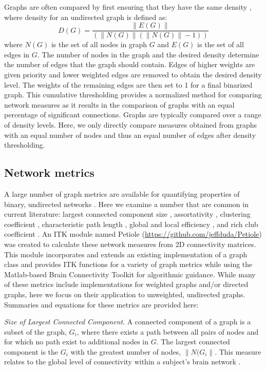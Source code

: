\documentclass{frontiersSCNS} %
\begin{document}
Graphs are often compared by first ensuring that they have the same density \citep{Achard2006,Bassett2006}, where density for an undirected graph is defined as:
$$D(G) = \frac{\|E(G)\|}{( \|N(G)\| (\|N(G)\|-1) )} $$
where $N(G)$ is the set of all nodes in graph $G$ and $E(G)$ is the set of all edges in $G$. The number of nodes in the graph and the desired density determine the number of edges that the graph should contain. Edges of higher weights are given priority and lower weighted edges are removed to obtain the desired density level. The weights of the remaining edges are then set to 1 for a final binarized graph. This cumulative thresholding provides a normalized method for comparing network measures as it results in the comparison of graphs with an equal percentage of significant connections. Graphs are typically compared over a range of density levels.  Here, we only directly compare measures obtained from graphs with an equal number of nodes and thus an equal number of edges after density thresholding.

\subsection{Network metrics}
A large number of graph metrics are available for quantifying properties of binary, undirected networks \citep{Rubinov2010}. Here we examine a number that 
are common in current literature: largest connected component size \citep{Bassett2011N}, assortativity \citep{Newman2006a,Bassett2008}, clustering coefficient \citep{Watts1998}, characteristic path length \citep{Watts1998}, global and local efficiency \citep{Latora2001}, and rich club coefficient \citep{Collin2013}. An ITK module named Petiole (\url{https://github.com/jeffduda/Petiole}) was created to calculate these network measures from 2D connectivity
matrices. This module incorporates and extends an existing implementation of a graph class \citep{Tustison2008} and provides ITK functions for a variety of graph metrics while using the Matlab-based Brain Connectivity Toolkit \citep{Rubinov2010} for algorithmic guidance. While many of these metrics include implementations for weighted graphs and/or directed graphs, here we focus on their application to unweighted, undirected graphs. Summaries and equations for these metrics are provided here:

\emph{Size of Largest Connected Component}.  A connected component of a graph is a subset of the graph, $G_{i}$, where there exists a path between all pairs of nodes and for which no path exist to additional nodes in $G$. The largest connected component is the $G_{i}$ with the greatest number of nodes, $\|N(G_{i}\|$. This measure relates to the global level of connectivity within a subject's brain network \citep{Bassett2011N}.
\end{document}
